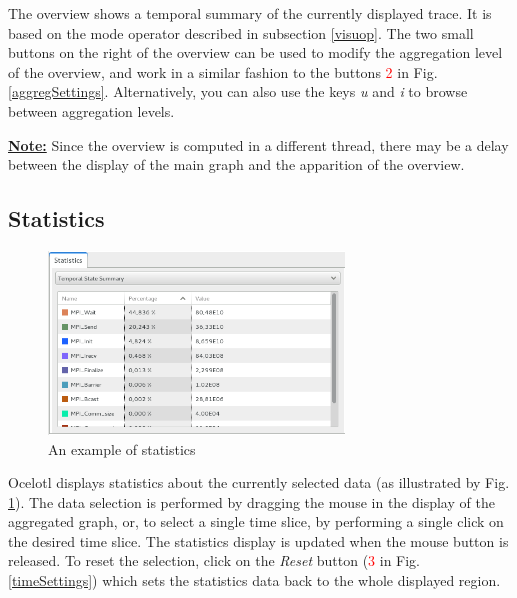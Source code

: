 \documentclass[twoside]{article}
\begin{document}
\begin{sloppypar}
The overview shows a temporal summary of the currently displayed trace. It is based on the mode operator described in subsection \ref{visuop}. The two small buttons on the right of the overview can be used to modify the aggregation level of the overview, and work in a similar fashion to the buttons \textcolor{red}{2} in Fig. \ref{aggregSettings}. Alternatively, you can also use the keys \textit{u} and \textit{i} to browse between aggregation levels.

\underline{\textbf{Note:}} Since the overview is computed in a different thread, there may be a delay between the display of the main graph and the apparition of the overview.

\subsection{Statistics}
\begin{figure}[h!]
	\centering
	\includegraphics[width=0.7\textwidth]{images/statistics.png}
	\caption{An example of statistics}
	\label{stats}
\end{figure}
Ocelotl displays statistics about the currently selected data (as illustrated by Fig. \ref{stats}). The data selection is performed by dragging the mouse in the display of the aggregated graph, or, to select a single time slice, by performing a single click on the desired time slice. The statistics display is updated when the mouse button is released. To reset the selection, click on the \textit{Reset} button (\textcolor{red}{3} in Fig. \ref{timeSettings}) which sets the statistics data back to the whole displayed region. 


\end{sloppypar}
\end{document}
